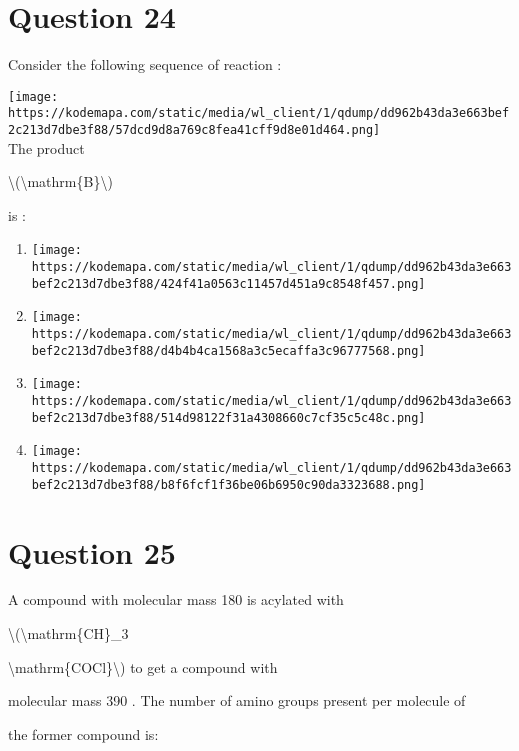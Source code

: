\documentclass{article}
\begin{document}
\section*{Question 24}
Consider the following sequence of reaction :



\texttt{[image: https://kodemapa.com/static/media/wl\_client/1/qdump/dd962b43da3e663bef2c213d7dbe3f88/57dcd9d8a769c8fea41cff9d8e01d464.png]}\\



The product \textquotesingle{}

\textbackslash(\textbackslash mathrm\{B\}\textbackslash)

\textquotesingle{} is :


\begin{enumerate}[label=(\alph*)]
\item \texttt{[image: https://kodemapa.com/static/media/wl\_client/1/qdump/dd962b43da3e663bef2c213d7dbe3f88/424f41a0563c11457d451a9c8548f457.png]}


\item \texttt{[image: https://kodemapa.com/static/media/wl\_client/1/qdump/dd962b43da3e663bef2c213d7dbe3f88/d4b4b4ca1568a3c5ecaffa3c96777568.png]}


\item \texttt{[image: https://kodemapa.com/static/media/wl\_client/1/qdump/dd962b43da3e663bef2c213d7dbe3f88/514d98122f31a4308660c7cf35c5c48c.png]}


\item \texttt{[image: https://kodemapa.com/static/media/wl\_client/1/qdump/dd962b43da3e663bef2c213d7dbe3f88/b8f6fcf1f36be06b6950c90da3323688.png]}


\end{enumerate}
\newpage
\section*{Question 25}
A compound with molecular mass 180 is acylated with

\textbackslash(\textbackslash mathrm\{CH\}\_3

\textbackslash mathrm\{COCl\}\textbackslash) to get a compound with

molecular mass 390 . The number of amino groups present per molecule of

the former compound is:


\begin{enumerate}[label=(\alph*)]
\end{enumerate}
\newpage
\end{document}
